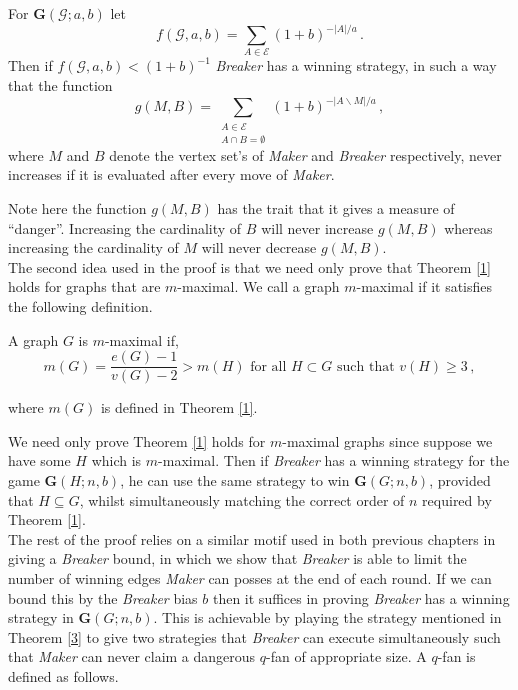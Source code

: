 \documentclass[a4paper,oneside,11pt]{report}
\begin{document}
\begin{theorem}\label{3}

For $\textbf{G}(\mathcal{G};a,b)$ let \[f(\mathcal{G}, a, b) = \sum_{A \in \mathcal{E}}(1+b)^{-\lvert A \rvert/a}\,.\] Then if $f(\mathcal{G},a,b) < (1+b)^{-1}$ \textit{Breaker} has a winning strategy, in such a way that the function \[g(M,B) = \sum_{\substack{A \in \mathcal{E} \\ A \cap B = \emptyset}}(1+b)^{-\lvert A \backslash M \rvert / a}\,,\] where $M$ and $B$ denote the vertex set's of \textit{Maker} and \textit{Breaker} respectively, never increases if it is evaluated after every move of \textit{Maker}.

\end{theorem}

Note here the function $g(M,B)$ has the trait that it gives a measure of ``danger''. Increasing the cardinality of $B$ will never increase $g(M,B)$ whereas increasing the cardinality of $M$ will never decrease $g(M,B)$.\\

The second idea used in the proof is that we need only prove that Theorem \ref{1} holds for graphs that are $m$-maximal. We call a graph $m$-maximal if it satisfies the following definition.

\begin{definition}[$m$-maximal]

A graph $G$ is $m$-maximal if, \[m(G) = \frac{e(G)-1}{v(G)-2} > m(H) \text{ for all } H \subset G \text{ such that } v(H) \geqslant 3\,,\]

where $m(G)$ is defined in Theorem \ref{1}.
    
\end{definition}

We need only prove Theorem \ref{1} holds for $m$-maximal graphs since suppose we have some $H$ which is $m$-maximal. Then if \textit{Breaker} has a winning strategy for the game $\textbf{G}(H;n,b)$, he can use the same strategy to win $\textbf{G}(G;n,b)$, provided that $H \subseteq G$, whilst simultaneously matching the correct order of $n$ required by Theorem \ref{1}.\\

The rest of the proof relies on a similar motif used in both previous chapters in giving a \textit{Breaker} bound, in which we show that \textit{Breaker} is able to limit the number of winning edges \textit{Maker} can posses at the end of each round. If we can bound this by the \textit{Breaker} bias $b$ then it suffices in proving \textit{Breaker} has a winning strategy in $\textbf{G}(G;n,b)$. This is achievable by playing the strategy mentioned in Theorem \ref{3} to give two strategies that \textit{Breaker} can execute simultaneously such that \textit{Maker} can never claim a dangerous $q$-fan of appropriate size. A $q$-fan is defined as follows.
\end{document}

